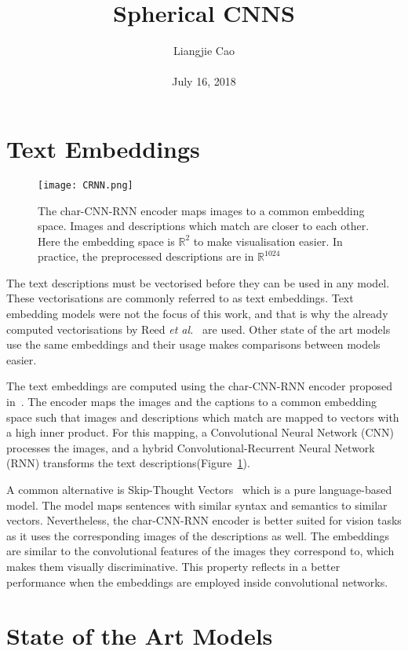 \documentclass[10pt,twocolumn,letterpaper]{article}
\begin{document}
\title{\textbf{Spherical CNNS
}}
\author{Liangjie Cao\\\\ July 16, 2018}
\maketitle
\section{Text Embeddings}
  \begin{figure}[!htbp]
  	\centering
  	\texttt{[image: CRNN.png]}\\
  	\caption{The char-CNN-RNN encoder maps images to a common embedding space. Images and descriptions which match are closer to each other. Here the embedding space is $\mathbb{R}^2$ to make visualisation easier. In practice, the preprocessed descriptions are in $\mathbb{R} ^{1024}$}\label{Figure1} 
  \end{figure}
The text descriptions must be vectorised before they can be used in any model. These vectorisations are commonly referred to as text embeddings. Text embedding models were not the focus of this work, and that is why the already computed vectorisations by Reed \emph{et al.}~\cite{name6} are used. Other state of the art models~\cite{name7,name8} use the same embeddings and their usage makes comparisons between models easier.
\par The text embeddings are computed using the char-CNN-RNN encoder proposed in~\cite{name6}. The encoder maps the images and the captions to a common embedding space such that images and descriptions which match are mapped to vectors with a high inner product. For this mapping, a Convolutional Neural Network (CNN) processes the images, and a
hybrid Convolutional-Recurrent Neural Network (RNN) transforms the text descriptions(Figure~\ref{Figure1}).
\par A common alternative is Skip-Thought Vectors~\cite{name9} which is a pure language-based model. The model maps sentences with similar syntax and semantics to similar vectors. Nevertheless, the char-CNN-RNN encoder is better suited for vision tasks as it uses the corresponding images of the descriptions as well. The embeddings are similar to the
convolutional features of the images they correspond to, which makes them visually discriminative. This property reflects in a better performance when the embeddings are employed inside convolutional networks.
\section{State of the Art Models}
\end{document}
